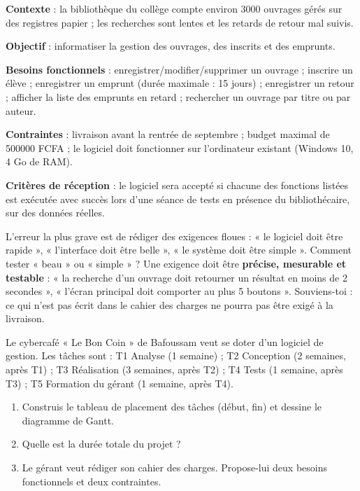 \documentclass[11pt]{article}
\begin{document}
\begin{exemplebox}
\textbf{Contexte} : la bibliothèque du collège compte environ \num{3000} ouvrages gérés sur des registres papier ; les recherches sont lentes et les retards de retour mal suivis.

\textbf{Objectif} : informatiser la gestion des ouvrages, des inscrits et des emprunts.

\textbf{Besoins fonctionnels} : enregistrer/modifier/supprimer un ouvrage ; inscrire un élève ; enregistrer un emprunt (durée maximale : 15 jours) ; enregistrer un retour ; afficher la liste des emprunts en retard ; rechercher un ouvrage par titre ou par auteur.

\textbf{Contraintes} : livraison avant la rentrée de septembre ; budget maximal de \num{500000} FCFA ; le logiciel doit fonctionner sur l'ordinateur existant (Windows 10, 4 Go de RAM).

\textbf{Critères de réception} : le logiciel sera accepté si chacune des fonctions listées est exécutée avec succès lors d'une séance de tests en présence du bibliothécaire, sur des données réelles.
\end{exemplebox}

\begin{attention}
L'erreur la plus grave est de rédiger des exigences floues : « le logiciel doit être rapide », « l'interface doit être belle », « le système doit être simple ». Comment tester « beau » ou « simple » ? Une exigence doit être \textbf{précise, mesurable et testable} : « la recherche d'un ouvrage doit retourner un résultat en moins de 2 secondes », « l'écran principal doit comporter au plus 5 boutons ». Souviens-toi : ce qui n'est pas écrit dans le cahier des charges ne pourra pas être exigé à la livraison.
\end{attention}

\begin{exercice}
Le cybercafé « Le Bon Coin » de Bafoussam veut se doter d'un logiciel de gestion. Les tâches sont : T1 Analyse (1 semaine) ; T2 Conception (2 semaines, après T1) ; T3 Réalisation (3 semaines, après T2) ; T4 Tests (1 semaine, après T3) ; T5 Formation du gérant (1 semaine, après T4).
\begin{enumerate}
\item Construis le tableau de placement des tâches (début, fin) et dessine le diagramme de Gantt.
\item Quelle est la durée totale du projet ?
\item Le gérant veut rédiger son cahier des charges. Propose-lui deux besoins fonctionnels et deux contraintes.
\end{enumerate}
\end{exercice}
\end{document}
